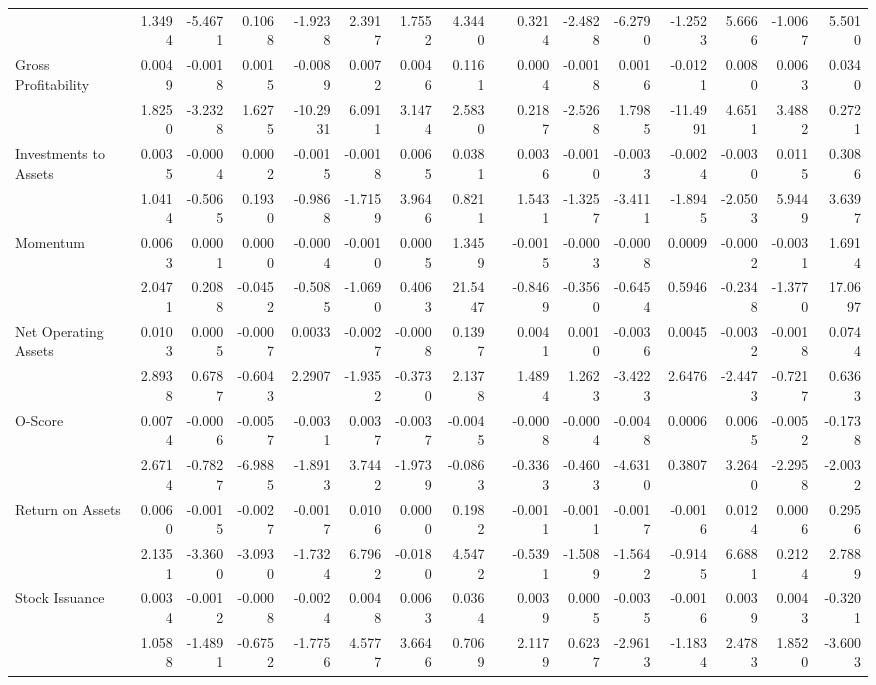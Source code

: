 \begin{table}[htbp]
{\begin{tabular}{lrrrrrrrrrrrrrrr}
            & 1.3494 & -5.4671 & 0.1068 & -1.9238 & 2.3917 & 1.7552 & 4.3440 &       & 0.3214 & -2.4828 & -6.2790 & -1.2523 & 5.6666 & -1.0067 & 5.5010 \\
      Gross Profitability & 0.0049 & -0.0018 & 0.0015 & -0.0089 & 0.0072 & 0.0046 & 0.1161 &       & 0.0004 & -0.0018 & 0.0016 & -0.0121 & 0.0080 & 0.0063 & 0.0340 \\
            & 1.8250 & -3.2328 & 1.6275 & -10.2931 & 6.0911 & 3.1474 & 2.5830 &       & 0.2187 & -2.5268 & 1.7985 & -11.4991 & 4.6511 & 3.4882 & 0.2721 \\
      Investments to Assets & 0.0035 & -0.0004 & 0.0002 & -0.0015 & -0.0018 & 0.0065 & 0.0381 &       & 0.0036 & -0.0010 & -0.0033 & -0.0024 & -0.0030 & 0.0115 & 0.3086 \\
            & 1.0414 & -0.5065 & 0.1930 & -0.9868 & -1.7159 & 3.9646 & 0.8211 &       & 1.5431 & -1.3257 & -3.4111 & -1.8945 & -2.0503 & 5.9449 & 3.6397 \\
      Momentum & 0.0063 & 0.0001 & 0.0000 & -0.0004 & -0.0010 & 0.0005 & 1.3459 &       & -0.0015 & -0.0003 & -0.0008 & 0.0009 & -0.0002 & -0.0031 & 1.6914 \\
            & 2.0471 & 0.2088 & -0.0452 & -0.5085 & -1.0690 & 0.4063 & 21.5447 &       & -0.8469 & -0.3560 & -0.6454 & 0.5946 & -0.2348 & -1.3770 & 17.0697 \\
      Net Operating Assets & 0.0103 & 0.0005 & -0.0007 & 0.0033 & -0.0027 & -0.0008 & 0.1397 &       & 0.0041 & 0.0010 & -0.0036 & 0.0045 & -0.0032 & -0.0018 & 0.0744 \\
            & 2.8938 & 0.6787 & -0.6043 & 2.2907 & -1.9352 & -0.3730 & 2.1378 &       & 1.4894 & 1.2623 & -3.4223 & 2.6476 & -2.4473 & -0.7217 & 0.6363 \\
      O-Score & 0.0074 & -0.0006 & -0.0057 & -0.0031 & 0.0037 & -0.0037 & -0.0045 &       & -0.0008 & -0.0004 & -0.0048 & 0.0006 & 0.0065 & -0.0052 & -0.1738 \\
            & 2.6714 & -0.7827 & -6.9885 & -1.8913 & 3.7442 & -1.9739 & -0.0863 &       & -0.3363 & -0.4603 & -4.6310 & 0.3807 & 3.2640 & -2.2958 & -2.0032 \\
      Return on Assets & 0.0060 & -0.0015 & -0.0027 & -0.0017 & 0.0106 & 0.0000 & 0.1982 &       & -0.0011 & -0.0011 & -0.0017 & -0.0016 & 0.0124 & 0.0006 & 0.2956 \\
            & 2.1351 & -3.3600 & -3.0930 & -1.7324 & 6.7962 & -0.0180 & 4.5472 &       & -0.5391 & -1.5089 & -1.5642 & -0.9145 & 6.6881 & 0.2124 & 2.7889 \\
      Stock Issuance & 0.0034 & -0.0012 & -0.0008 & -0.0024 & 0.0048 & 0.0063 & 0.0364 &       & 0.0039 & 0.0005 & -0.0035 & -0.0016 & 0.0039 & 0.0043 & -0.3201 \\
            & 1.0588 & -1.4891 & -0.6752 & -1.7756 & 4.5777 & 3.6646 & 0.7069 &       & 2.1179 & 0.6237 & -2.9613 & -1.1834 & 2.4783 & 1.8520 & -3.6003 \\
      \bottomrule
      \end{tabular}%
    }
    \label{tab:vol-ff6}%
  \end{table}%

